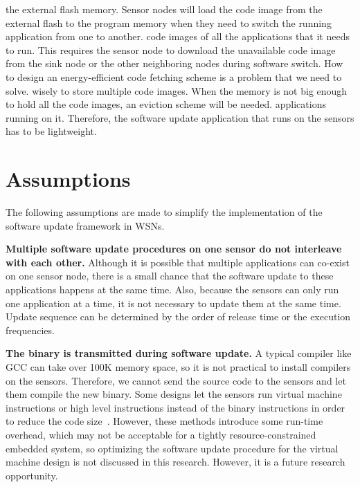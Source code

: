 the external flash memory. Sensor nodes will load the code image from the external flash to the program memory when 
they need to switch the running application from one to another.
%
code images of all the applications that it needs to run. This requires the sensor node to download the unavailable 
code image from the sink node or the other neighboring nodes during software switch. How to design an energy-efficient 
code fetching scheme is a problem that we need to solve.
%
wisely to store multiple code images. When the memory is not big enough to hold all the code images, an eviction scheme 
will be needed.
%
%
applications running on it. Therefore, the software update application that runs on the sensors has to be lightweight.



\section{Assumptions}
The following assumptions are made to simplify the implementation of the software update framework in WSNs.

\textbf{Multiple software update procedures on one sensor do not interleave with each other.}
Although it is possible that multiple applications can co-exist on one sensor node, there is a small chance that the 
software update to these applications happens at the same time.
Also, because the sensors can only run one application at a time, it is not necessary to update them at the same time.
Update sequence can be determined by the order of release time or the execution frequencies.

\textbf{The binary is transmitted during software update.}
A typical compiler like GCC can take over 100K memory space, so it is not practical to install compilers on the sensors.
Therefore, we cannot send the source code to the sensors and let them compile the new binary.
Some designs let the sensors run virtual machine instructions or high level instructions instead of the binary 
instructions in order to reduce the code size~\cite{mate,related:dynamic1, related:dynamic2}. However, these methods 
introduce some run-time overhead, which may not be acceptable for a tightly resource-constrained embedded system, so 
optimizing the software update procedure for the virtual machine design is not discussed in this research. However, it 
is a future research opportunity.

